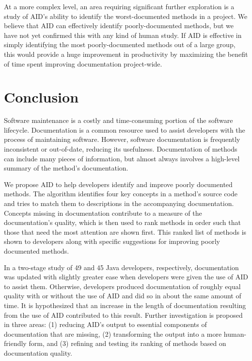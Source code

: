 \documentclass[preprint]{sigplanconf}
\begin{document}
At a more complex level, an area requiring significant further exploration is a study of AID's ability to identify the worst-documented methods in a project. We believe that AID can effectively identify poorly-documented methods, but we have not yet confirmed this with any kind of human study. If AID is effective in simply identifying the most poorly-documented methods out of a large group, this would provide a huge improvement in productivity by maximizing the benefit of time spent improving documentation project-wide.

\section{Conclusion}
Software maintenance is a costly and time-consuming portion of the software lifecycle. Documentation is a common resource used to assist developers with the process of maintaining software. However, software documentation is frequently inconsistent or out-of-date, reducing its usefulness. Documentation of methods can include many pieces of information, but almost always involves a high-level summary of the method's documentation.

We propose AID to help developers identify and improve poorly documented methods. The algorithm identifies four key concepts in a method's source code and tries to match them to descriptions in the accompanying documentation. Concepts missing in documentation contribute to a measure of the documentation's quality, which is then used to rank methods in order such that those that need the most attention are shown first. This ranked list of methods is shown to developers along with specific suggestions for improving poorly documented methods.

In a two-stage study of 49 and 45 Java developers, respectively, documentation was updated with slightly greater ease when developers were given the use of AID to assist them. Otherwise, developers produced documentation of roughly equal quality with or without the use of AID and did so in about the same amount of time. It is hypothesized that an increase in the length of documentation resulting from the use of AID contributed to this result. Further investigation is proposed in three areas: (1) reducing AID's output to essential components of documentation that are missing, (2) transforming the output into a more human-friendly form, and (3) refining and testing its ranking of methods based on documentation quality.

\acks
\end{document}
